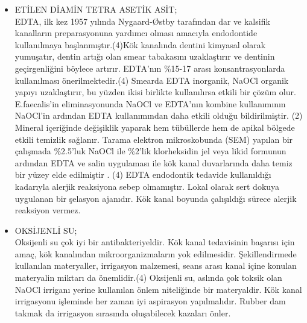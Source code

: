 \begin{itemize}
   
   \item ETİLEN DİAMİN TETRA ASETİK ASİT;\\
   EDTA, ilk kez 1957 yılında Nygaard-Østby tarafından dar ve kalsifik kanalların preparasyonuna yardımcı olması amacıyla endodontide kullanılmaya başlanmıştır.(4)Kök kanalında dentini kimyasal olarak yumuşatır, dentin artığı olan smear tabakasını uzaklaştırır ve dentinin geçirgenliğini böylece artırır. EDTA’nın \%15-17 arası konsantrasyonlarda kullanılması önerilmektedir.(4) Smearda EDTA inorganik, NaOCl organik yapıyı uzaklaştırır, bu yüzden ikisi birlikte kullanılırsa etkili bir çözüm olur. E.faecalis’in eliminasyonunda NaOCl ve EDTA’nın kombine kullanımının NaOCl’in ardından EDTA kullanımından daha etkili olduğu bildirilmiştir. (2) Mineral içeriğinde değişiklik yaparak hem tübüllerde hem de apikal bölgede etkili temizlik sağlanır. Tarama elektron mikroskobunda (SEM) yapılan bir çalışmada \%2.5’luk NaOCl ile \%2’lik klorheksidin jel veya likid formunun ardından EDTA ve salin uygulaması ile kök kanal duvarlarında daha temiz bir yüzey elde edilmiştir . (4)
EDTA  endodontik tedavide kullanıldığı kadarıyla alerjik reaksiyona sebep olmamıştır. Lokal olarak sert dokuya uygulanan bir şelasyon ajanıdır. Kök kanal boyunda çalışıldığı sürece alerjik reaksiyon vermez.
 \item OKSİJENLİ SU;\\
 Oksijenli su çok iyi bir antibakteriyeldir.
Kök kanal tedavisinin başarısı için amaç, kök kanalından mikroorganizmaların yok edilmesidir. Şekillendirmede kullanılan materyaller, irrigasyon malzemesi, seans arası kanal içine konulan materyalin miktarı da önemlidir.(4)
Oksijenli su, aslında çok toksik olan NaOCl irriganı yerine kullanılan önlem niteliğinde bir materyaldir. Kök kanal irrigasyonu işleminde her zaman iyi aspirasyon yapılmalıdır. Rubber dam takmak da irrigasyon sırasında oluşabilecek kazaları önler.

   
\end{itemize}



